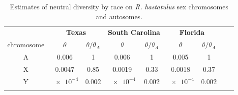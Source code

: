 \documentclass[9pt,twocolumn,twoside]{gsajnl}
\begin{document}



\begin{table}[t!]
\centering
\caption{Estimates of neutral diversity by race on \textit{R. hastatulus} sex chromosomes and autosomes.}
\begin{tabular}{ccccccccc}
\textbf{} & \multicolumn{2}{c}{\textbf{Texas}} & \multicolumn{2}{c}{\textbf{South Carolina}} & \multicolumn{2}{c}{\textbf{Florida}} \\
chromosome & $\theta$ & $\theta/\theta_{A}$ & $\theta$ & $\theta/\theta_{A}$ & $\theta$ & $\theta/\theta_{A}$ \\
\midrule
A & 0.006 & 1 & 0.006 & 1 & 0.005 & 1 \\
X & 0.0047 & 0.85 & 0.0019 & 0.33 & 0.0018 & 0.37 \\
Y & $\num{e-4}$ & 0.002 & $\num{e-4}$ & 0.002 & $\num{e-4}$ & 0.002 \\
\addlinespace

\bottomrule
\end{tabular}
\end{table}
\end{document}
